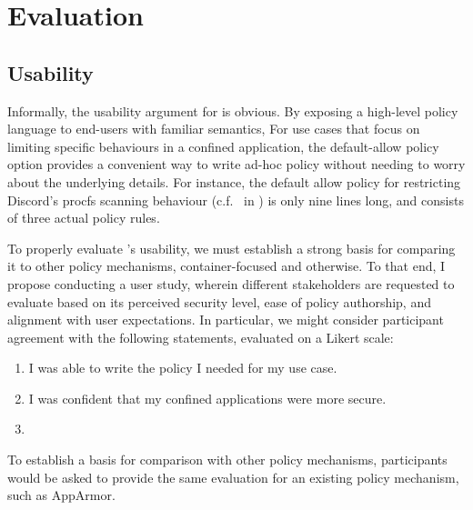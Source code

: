 \section{Evaluation}

\subsection{Usability}

Informally, the usability argument for \bpfcontain{} is obvious. By exposing a high-level policy language to end-users with familiar semantics, \bpfcontain{}
 For use cases that focus on limiting specific behaviours in a confined application, the default-allow policy option provides a convenient way to write ad-hoc policy without needing to worry about the underlying details. For instance, the default allow policy for restricting Discord's procfs scanning behaviour (c.f.~ in ) is only nine lines long, and consists of three actual policy rules.

To properly evaluate \bpfcontain{}'s usability, we must establish a strong basis for comparing it to other policy mechanisms, container-focused and otherwise. To that end, I propose conducting a user study, wherein different stakeholders are requested to evaluate \bpfcontain{} based on its perceived security level, ease of policy authorship, and alignment with user expectations.  In particular, we might consider participant agreement with the following statements, evaluated on a Likert scale:
\begin{enumerate}[label=\bf Q\arabic*.]
  \item I was able to write the policy I needed for my use case.
  \item I was confident that my confined applications were more secure.
  \item {}
\end{enumerate}
To establish a basis for comparison with other policy mechanisms, participants would be asked to provide the same evaluation for an existing policy mechanism, such as AppArmor.

